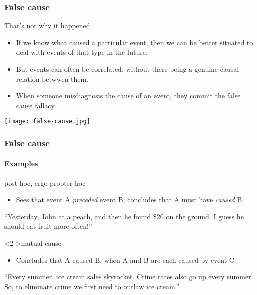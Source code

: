 \documentclass[10pt,letterpaper,xcolor=dvipsnames,handout]{beamer}
\begin{document}
\begin{frame}
  \frametitle{False cause}
  
  \begin{block}{That's not why it happened}
    \begin{itemize}
      \item If we know what caused a particular event, then we can be better situated to deal with events of that type in the future.
      \item But events can often be correlated, without there being a genuine causal relation betwwen them.
      \item When someone misdiagnosis the cause of an event, they commit the false cause fallacy.
    \end{itemize}
  \end{block}
  
    \begin{center}
    \texttt{[image: false-cause.jpg]}
  \end{center}
  
\end{frame}

\begin{frame}
  \frametitle{False cause}
  \framesubtitle{Examples}
  
  \begin{block}{post hoc, ergo propter hoc}
    \begin{itemize}
      \item Sees that event A \textit{preceded} event B; concludes that A must have \textit{caused} B
    \end{itemize}
    
    ``Yesterday, John at a peach, and then he found \$20 on the ground.  I guess he should eat fruit more often!''
  \end{block}
  
  \begin{block}<2->{mutual cause}
    \begin{itemize}
      \item Concludes that A caused B, when A and B are each caused by event C
    \end{itemize}
    
    ``Every summer, ice cream sales skyrocket.  Crime rates also go up every summer.  So, to eliminate crime we first need to outlaw ice cream.''
  \end{block}
  
\end{frame}
\end{document}
